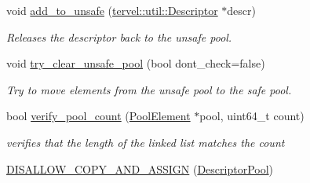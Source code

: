\begin{DoxyCompactItemize}
void \hyperlink{classtervel_1_1util_1_1memory_1_1rc_1_1_descriptor_pool_aae0b2295f7166b40c9c748a5ed78f570}{add\+\_\+to\+\_\+unsafe} (\hyperlink{classtervel_1_1util_1_1_descriptor}{tervel\+::util\+::\+Descriptor} $\ast$descr)
\begin{DoxyCompactList}\small\item\em Releases the descriptor back to the unsafe pool. \end{DoxyCompactList}\item 
void \hyperlink{classtervel_1_1util_1_1memory_1_1rc_1_1_descriptor_pool_aff5201eac41e952363dab1e23949f629}{try\+\_\+clear\+\_\+unsafe\+\_\+pool} (bool dont\+\_\+check=false)
\begin{DoxyCompactList}\small\item\em Try to move elements from the unsafe pool to the safe pool. \end{DoxyCompactList}\item 
bool \hyperlink{classtervel_1_1util_1_1memory_1_1rc_1_1_descriptor_pool_a602d77f377890c6c32311d8764a616a5}{verify\+\_\+pool\+\_\+count} (\hyperlink{classtervel_1_1util_1_1memory_1_1rc_1_1_pool_element}{Pool\+Element} $\ast$pool, uint64\+\_\+t count)
\begin{DoxyCompactList}\small\item\em verifies that the length of the linked list matches the count \end{DoxyCompactList}\item 
\hyperlink{classtervel_1_1util_1_1memory_1_1rc_1_1_descriptor_pool_a1a47980d510a2178f37a1c44fb54be54}{D\+I\+S\+A\+L\+L\+O\+W\+\_\+\+C\+O\+P\+Y\+\_\+\+A\+N\+D\+\_\+\+A\+S\+S\+I\+G\+N} (\hyperlink{classtervel_1_1util_1_1memory_1_1rc_1_1_descriptor_pool}{Descriptor\+Pool})
\end{DoxyCompactItemize}
